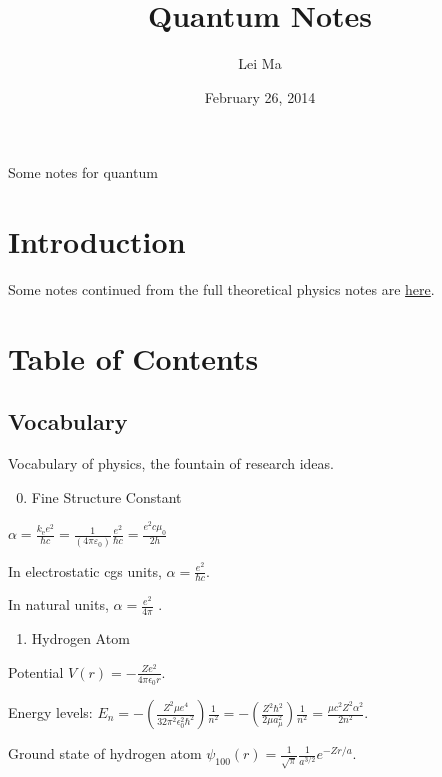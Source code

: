 \documentclass[letterpaper,10pt,english]{sphinxmanual}
\title{Quantum Notes}
\date{February 26, 2014}
\author{Lei Ma}
\begin{document}
\maketitle
\tableofcontents
{}\label{index::doc}


Some notes for quantum


\chapter{Introduction}
\label{index:introduction}\label{index:quantum-notes}
Some notes continued from the full theoretical physics notes are \href{http://cosmologytaskforce.github.io/PhysicsResearchSurvivalManual/}{here}.


\chapter{Table of Contents}
\label{index:table-of-contents}

\section{Vocabulary}
\label{vocabulary::doc}\label{vocabulary:vocabulary}
Vocabulary of physics, the fountain of research ideas.
\begin{enumerate}
\setcounter{enumi}{-1}
\item {} 
Fine Structure Constant

\end{enumerate}

$\alpha = \frac{k_\mathrm{e} e^2}{\hbar c} = \frac{1}{(4 \pi \varepsilon_0)} \frac{e^2}{\hbar c} = \frac{e^2 c \mu_0}{2 h}$

In electrostatic cgs units, $\alpha = \frac{e^2}{\hbar c}$.

In natural units, $\alpha = \frac{e^2}{4 \pi}$ .
\begin{enumerate}
\item {} 
Hydrogen Atom

\end{enumerate}

Potential $V(r) = -\frac{Z e^2}{4\pi \epsilon_0 r}$.

Energy levels: $E_{n} = -\left(\frac{Z^2 \mu e^4}{32 \pi^2\epsilon_0^2\hbar^2}\right)\frac{1}{n^2} = -\left(\frac{Z^2\hbar^2}{2\mu a_{\mu}^2}\right)\frac{1}{n^2} = \frac{\mu c^2Z^2\alpha^2}{2n^2}.$

Ground state of hydrogen atom $\psi_{100}(r)=\frac{1}{\sqrt{\pi}}\frac{1}{a^{3/2}} e^{-Z r/a}$.
\end{document}
